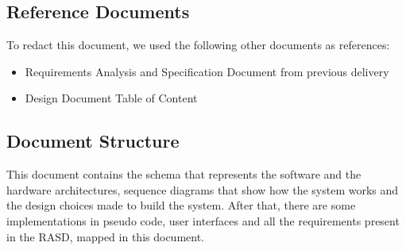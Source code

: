 \subsection{Reference Documents}
	To redact this document, we used the following other documents as references:
	\begin{itemize}
		\item Requirements Analysis and Specification Document from previous delivery
		\item Design Document Table of Content 
	\end{itemize}
\subsection{Document Structure}
	This document contains the schema that represents the software and the hardware architectures, sequence diagrams that show how the system works and the design choices made to build the system. After that, there are some implementations in pseudo code, user interfaces and all the requirements present in the RASD, mapped in this document.